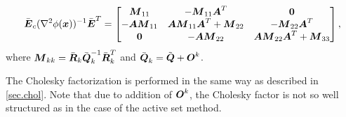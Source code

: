 $$
\bar{\mbm{E}}_c (\nabla^2\phi(\mbm{x}))^{-1} \bar{\mbm{E}}^T
= 
  \begin{bmatrix} 
    \mbm{M}_{11}    &  -\mbm{M}_{11}\mbm{A}^T    &  \mbm{0}  \\
    -\mbm{A}\mbm{M}_{11} & \mbm{A}\mbm{M}_{11}\mbm{A}^T + \mbm{M}_{22}   &  -\mbm{M}_{22}\mbm{A}^T \\
    \mbm{0}    &  -\mbm{A}\mbm{M}_{22} & \mbm{A}\mbm{M}_{22}\mbm{A}^T + \mbm{M}_{33} \\
  \end{bmatrix},
$$
where $\mbm{M}_{kk} = \bar{\mbm{R}}_k\bar{\mbm{Q}}^{-1}_k\bar{\mbm{R}}_k^T$ and
$\bar{\mbm{Q}}_k = \tilde{\mbm{Q}} + \mbm{O}^k$.

The Cholesky factorization is performed in the same way as described in \cref{sec.chol}. 
Note that due to addition of $\mbm{O}^k$, the Cholesky factor is not so well structured 
as in the case of the active set method.
